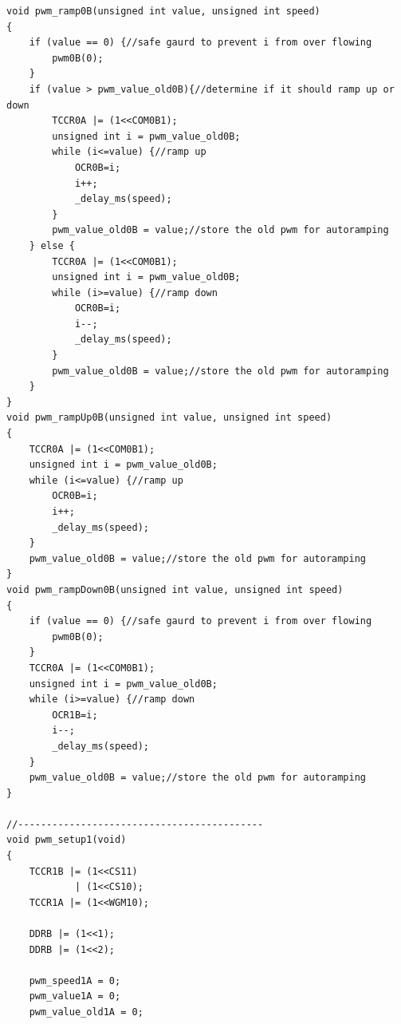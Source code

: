\documentclass{article}
\begin{document}
\begin{lstlisting}[caption={The PWM function library.},label=pwm,frame=tbl]
void pwm_ramp0B(unsigned int value, unsigned int speed)
{
    if (value == 0) {//safe gaurd to prevent i from over flowing
        pwm0B(0);
    }
    if (value > pwm_value_old0B){//determine if it should ramp up or down
        TCCR0A |= (1<<COM0B1);
        unsigned int i = pwm_value_old0B;
        while (i<=value) {//ramp up
            OCR0B=i;
            i++;
            _delay_ms(speed);
        }
        pwm_value_old0B = value;//store the old pwm for autoramping
    } else {
        TCCR0A |= (1<<COM0B1);
        unsigned int i = pwm_value_old0B;
        while (i>=value) {//ramp down
            OCR0B=i;
            i--;
            _delay_ms(speed);
        }
        pwm_value_old0B = value;//store the old pwm for autoramping
    }
}
void pwm_rampUp0B(unsigned int value, unsigned int speed)
{
    TCCR0A |= (1<<COM0B1);
    unsigned int i = pwm_value_old0B;
    while (i<=value) {//ramp up
        OCR0B=i;
        i++;
        _delay_ms(speed);
    }
    pwm_value_old0B = value;//store the old pwm for autoramping
}
void pwm_rampDown0B(unsigned int value, unsigned int speed)
{
    if (value == 0) {//safe gaurd to prevent i from over flowing
        pwm0B(0);
    }
    TCCR0A |= (1<<COM0B1);
    unsigned int i = pwm_value_old0B;
    while (i>=value) {//ramp down
        OCR1B=i;
        i--;
        _delay_ms(speed);
    }
    pwm_value_old0B = value;//store the old pwm for autoramping
}

//-------------------------------------------
void pwm_setup1(void)
{
    TCCR1B |= (1<<CS11)
            | (1<<CS10);
    TCCR1A |= (1<<WGM10);

    DDRB |= (1<<1);
    DDRB |= (1<<2);

    pwm_speed1A = 0;
    pwm_value1A = 0;
    pwm_value_old1A = 0;


\end{lstlisting}
\end{document}
